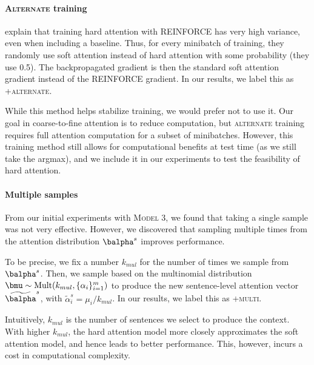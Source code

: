 \documentclass[12pt]{report}
\begin{document}
\paragraph{\textsc{Alternate} training} \citet{xu2015captioning} explain that training hard attention with REINFORCE has very high variance, even when including a baseline. Thus, for every minibatch of training, they randomly use soft attention instead of hard attention with some probability (they use 0.5).
The backpropagated gradient is then the standard soft attention gradient instead of the REINFORCE gradient. In our results, we label this as \textsc{+alternate}.

While this method helps stabilize training, we would prefer not to use it. Our goal in coarse-to-fine attention is to reduce computation, but \textsc{alternate} training requires full attention computation for a subset of minibatches. However, this training method still allows for computational benefits at test time (as we still take the argmax), and we include it in our experiments to test the feasibility of hard attention.


\paragraph{Multiple samples} 
From our initial experiments with \textsc{Model 3}, we found that taking a single sample was not very effective. However, we discovered that sampling multiple times from the attention distribution $\balpha^s$ improves performance.

To be precise, we fix a number $k_{mul}$ for the number of times we sample from $\balpha^s$. Then, we sample based on the multinomial distribution $\bmu \sim \mathrm{Mult}(k_{mul}, \{\alpha_i\}_{i=1}^m)$ to produce the new sentence-level attention vector $\widetilde{\balpha}^s$, with $\widetilde{\alpha}_i^s = \mu_i / k_{mul}$. In our results, we label this as \textsc{+multi}.

Intuitively, $k_{mul}$ is the number of sentences we select to produce the context. With higher $k_{mul}$, the hard attention model more closely approximates the soft attention model, and hence leads to better performance. This, however, incurs a cost in computational complexity.

%
%
%
\end{document}
